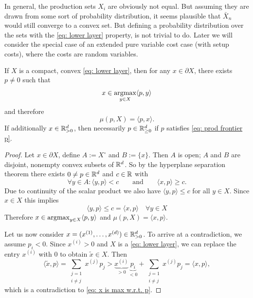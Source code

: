 In general, the production sets \(X_i\) are obviously not equal. But assuming
they are drawn from some sort of probability distribution, it seems plausible
that \(\bar{X}_n\) would still converge to a convex set. But defining a
probability distribution over the sets with the \ref{eq: lower layer} property,
is not trivial to do. Later we will consider the special case of an
extended pure variable cost case (with setup costs), where the costs are random
variables.

\begin{lemma}
	\label{lem: duality of support function}
	If \(X\) is a compact, convex \ref{eq: lower
	layer}, then for any \(x\in \partial X\), there exists
	\(p\neq 0\) such that
	\begin{equation}
		\label{eq: prod frontier p}
		x \in \argmax_{y\in X} \langle p, y\rangle %
	\end{equation}
	and therefore
	\[
		\mu(p, X) = \langle p, x\rangle.
	\]
	If additionally \(x\in\mathbb{R}_{>0}^d\), then necessarily \(p\in\mathbb{R}_{\ge
	0}^d\) if \(p\) satisfies \eqref{eq: prod frontier p}.
\end{lemma}
\begin{proof}
	Let \(x\in \partial X\), define \(A:=X^\circ\) and \(B:=\{x\}\). Then \(A\)
	is open; \(A\) and \(B\) are disjoint, nonempty
	convex subsets of \(\mathbb{R}^d\). So by the hyperplane separation theorem
	there exists
	\(0\neq p\in\mathbb{R}^d\) and \(c\in\mathbb{R}\) with
	\[
		\forall y\in A : \langle y, p\rangle < c
		\qquad\text{and}\qquad
		\langle x, p\rangle \ge c.
	\]
	Due to continuity of the scalar product we also have \(\langle y, p\rangle
	\le c\) for all \(y\in X\). Since \(x\in X\) this implies
	\begin{equation}
		\label{eq: x is max w.r.t. p}
		\langle y, p\rangle \le c = \langle x, p\rangle \quad \forall y\in X
	\end{equation}
	Therefore \(x\in\operatorname*{argmax}_{y\in X} \langle p, y\rangle\) and \(\mu(p, X) =
	\langle x, p\rangle\).

	Let us now consider \(x=(x^{(1)},\dots,x^{(d)})\in\mathbb{R}_{>0}^d\).
	To arrive at a contradiction, we assume \(p_i < 0\). Since \(x^{(i)}>0\) and
	\(X\) is a \ref{eq: lower layer}, we can replace the entry \(x^{(i)}\) with
	\(0\) to obtain \(\tilde{x}\in X\). Then
	\[
		\langle \tilde{x}, p\rangle
		= \sum_{\substack{j=1\\i\neq j}} x^{(j)} p_j
		> \underbrace{x^{(i)}}_{>0}\underbrace{p_i}_{<0}
		+ \sum_{\substack{j=1\\i\neq j}} x^{(j)} p_j
		= \langle x, p\rangle,
	\]
	which is a contradiction to \eqref{eq: x is max w.r.t. p}.
\end{proof}

